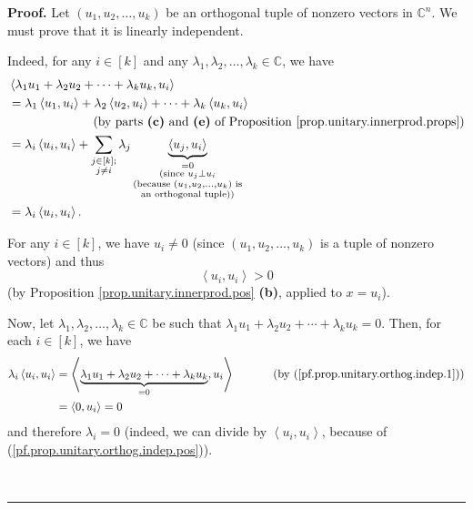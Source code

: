 \documentclass[numbers=enddot,12pt,final,onecolumn,notitlepage]{scrartcl}%
\numberwithin{exer}{subsection}
\theoremstyle{definition}
\newenvironment{proof}[1][Proof]{\noindent\textbf{#1.} }{\ \rule{0.5em}{0.5em}}
\let\sumnonlimits\sum
\renewcommand{\sum}{\sumnonlimits\limits}
\begin{document}
\begin{proof}
Let $\left(  u_{1},u_{2},\ldots,u_{k}\right)  $ be an orthogonal tuple of
nonzero vectors in $\mathbb{C}^{n}$. We must prove that it is linearly independent.

Indeed, for any $i\in\left[  k\right]  $ and any $\lambda_{1},\lambda
_{2},\ldots,\lambda_{k}\in\mathbb{C}$, we have
\begin{align}
&  \left\langle \lambda_{1}u_{1}+\lambda_{2}u_{2}+\cdots+\lambda_{k}%
u_{k},u_{i}\right\rangle \nonumber\\
&  =\lambda_{1}\left\langle u_{1},u_{i}\right\rangle +\lambda_{2}\left\langle
u_{2},u_{i}\right\rangle +\cdots+\lambda_{k}\left\langle u_{k},u_{i}%
\right\rangle \nonumber\\
&  \ \ \ \ \ \ \ \ \ \ \ \ \ \ \ \ \ \ \ \ \left(  \text{by parts \textbf{(c)}
and \textbf{(e)} of Proposition \ref{prop.unitary.innerprod.props}}\right)
\nonumber\\
&  =\lambda_{i}\left\langle u_{i},u_{i}\right\rangle +\sum_{\substack{j\in
\left[  k\right]  ;\\j\neq i}}\lambda_{j}\underbrace{\left\langle u_{j}%
,u_{i}\right\rangle }_{\substack{=0\\\text{(since }u_{j}\perp u_{i}%
\\\text{(because }\left(  u_{1},u_{2},\ldots,u_{k}\right)  \text{
is}\\\text{an orthogonal tuple))}}}\nonumber\\
&  =\lambda_{i}\left\langle u_{i},u_{i}\right\rangle .
\label{pf.prop.unitary.orthog.indep.1}%
\end{align}


For any $i\in\left[  k\right]  $, we have $u_{i}\neq0$ (since $\left(
u_{1},u_{2},\ldots,u_{k}\right)  $ is a tuple of nonzero vectors) and thus
\begin{equation}
\left\langle u_{i},u_{i}\right\rangle >0
\label{pf.prop.unitary.orthog.indep.pos}%
\end{equation}
(by Proposition \ref{prop.unitary.innerprod.pos} \textbf{(b)}, applied to
$x=u_{i}$).

Now, let $\lambda_{1},\lambda_{2},\ldots,\lambda_{k}\in\mathbb{C}$ be such
that $\lambda_{1}u_{1}+\lambda_{2}u_{2}+\cdots+\lambda_{k}u_{k}=0$. Then, for
each $i\in\left[  k\right]  $, we have%
\begin{align*}
\lambda_{i}\left\langle u_{i},u_{i}\right\rangle  &  =\left\langle
\underbrace{\lambda_{1}u_{1}+\lambda_{2}u_{2}+\cdots+\lambda_{k}u_{k}}%
_{=0},u_{i}\right\rangle \ \ \ \ \ \ \ \ \ \ \left(  \text{by
(\ref{pf.prop.unitary.orthog.indep.1})}\right) \\
&  =\left\langle 0,u_{i}\right\rangle =0
\end{align*}
and therefore $\lambda_{i}=0$ (indeed, we can divide by $\left\langle
u_{i},u_{i}\right\rangle $, because of (\ref{pf.prop.unitary.orthog.indep.pos})).


\end{proof}
\end{document}
